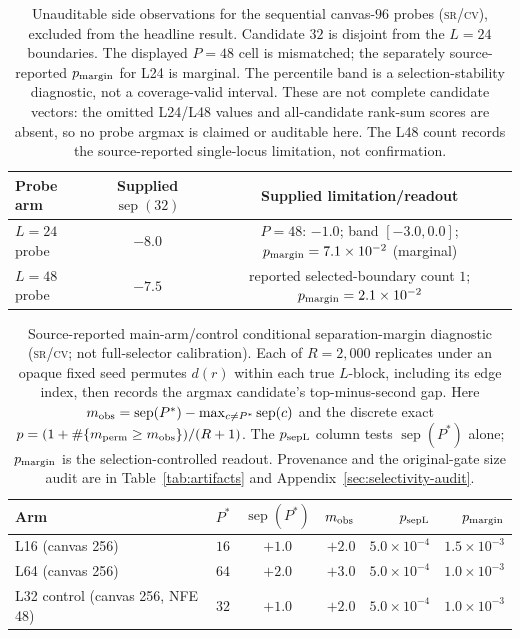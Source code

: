 \documentclass{article}
\newcommand{\srcv}{\textsc{sr/cv}}
\begin{document}
\begin{table}[H]
\centering
\footnotesize
\setlength{\tabcolsep}{4pt}
\begin{tabular}{@{}lcc@{}}
\toprule
Probe arm & Supplied $\operatorname{sep}(32)$ & Supplied limitation/readout \\
\midrule
$L{=}24$ probe & $-8.0$ & \shortstack{$P{=}48$: $-1.0$; band $[-3.0,0.0]$;\\$p_{\rm margin}=7.1\times10^{-2}$ (marginal)} \\
$L{=}48$ probe & $-7.5$ & \shortstack{reported selected-boundary count $1$;\\$p_{\rm margin}=2.1\times10^{-2}$} \\
\bottomrule
\end{tabular}
\caption{Unauditable side observations for the sequential canvas-$96$ probes
(\srcv), excluded from the headline result.
Candidate $32$ is disjoint from
the $L{=}24$ boundaries. The displayed $P{=}48$ cell is mismatched; the
separately source-reported $p_{\rm margin}$ for L24 is marginal.  The percentile
band is a selection-stability diagnostic, not a coverage-valid interval. These are not
complete candidate vectors: the omitted L24/L48 values and all-candidate
rank-sum scores are absent, so no probe argmax is claimed or auditable here. The
L48 count records the source-reported single-locus limitation, not confirmation.}
\label{tab:probes}
\end{table}

\FloatBarrier
\begin{table}[H]
\centering
\footnotesize
\setlength{\tabcolsep}{3.2pt}
\begin{tabular}{@{}lccrrr@{}}
\toprule
Arm & $P^*$ & $\operatorname{sep}(P^*)$ & $m_{\rm obs}$ & $p_{\rm sepL}$ & $p_{\rm margin}$ \\
\midrule
L16 (canvas 256) & $16$ & $+1.0$ & $+2.0$ & $5.0\times10^{-4}$ & $1.5\times10^{-3}$ \\
L64 (canvas 256) & $64$ & $+2.0$ & $+3.0$ & $5.0\times10^{-4}$ & $1.0\times10^{-3}$ \\
L32 control (canvas 256, NFE 48) & $32$ & $+1.0$ & $+2.0$ & $5.0\times10^{-4}$ & $1.0\times10^{-3}$ \\
\bottomrule
\end{tabular}
\caption{Source-reported main-arm/control conditional separation-margin
diagnostic (\srcv; not full-selector calibration). Each of $R{=}2{,}000$
replicates under an opaque fixed seed permutes $d(r)$ within each true $L$-block,
including its edge index, then records the argmax candidate's top-minus-second
gap. Here $m_{\rm obs}=\operatorname{sep}(P^*)-
\max_{c\ne P^*}\operatorname{sep}(c)$ and the discrete exact
$p=(1+\#\{m_{\rm perm}\ge m_{\rm obs}\})/(R+1)$. The $p_{\rm sepL}$ column
tests $\operatorname{sep}(P^*)$ alone; $p_{\rm margin}$ is the
selection-controlled readout. Provenance and the original-gate size audit are
in Table~\ref{tab:artifacts} and Appendix~\ref{sec:selectivity-audit}.}
\label{tab:sep-null}
\end{table}
\end{document}
